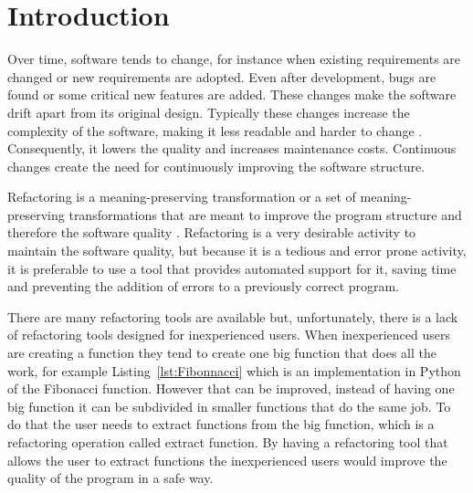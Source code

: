
% 
% 


\section{Introduction}
\label{sec:Introduction}

Over time, software tends to change, for instance when existing requirements are changed or new requirements are adopted. 
Even after development, bugs are found or some critical new features are added.
These changes make the software drift apart from its original design.
Typically these changes increase the complexity of the software, making it less readable and harder to change \cite{mens2003refactoring}. 
Consequently, it lowers the quality and increases maintenance costs.
Continuous changes create the need for continuously improving the software structure.

Refactoring is a meaning-preserving transformation or a set of meaning-preserving transformations that are meant to improve the program structure and therefore the software quality \cite{bourquin2007high}.
Refactoring is a very desirable activity to maintain the software quality, but because it is a tedious and error prone activity, it is preferable to use a tool that provides automated support for it, saving time and preventing the addition of errors to a previously correct program.

%
There are many refactoring tools are available but, unfortunately, there is a lack of refactoring tools designed for inexperienced users.
When inexperienced users are creating a function they tend to create one big function that does all the work, for example Listing~\ref{lst:Fibonnacci} which is an implementation in Python of the Fibonacci function.
However that can be improved, instead of having one big function it can be subdivided in smaller functions that do the same job.
To do that the user needs to extract functions from the big function, which is a refactoring operation called extract function.
By having a refactoring tool that allows the user to extract functions the inexperienced users would improve the quality of the program in a safe way.



